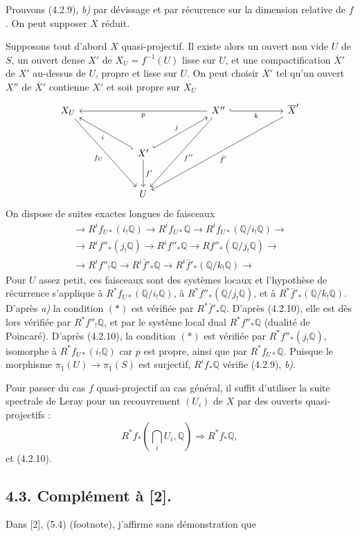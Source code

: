 \documentclass[10pt]{article}
\newcommand{\Q}{\mathbb Q}
\begin{document}
Prouvons (4.2.9), \textit{b)} par dévissage et par récurrence sur la dimension relative de $f$. On peut supposer $X$ réduit.

Supposons tout d'abord $X$ quasi-projectif. Il existe alors un ouvert non vide $U$ de $S$, un ouvert dense $X'$ de $X_U=f^{-1}(U)$ lisse sur $U$, et une compactification $\overline X'$ de $X'$ au-dessus de $U$, propre et lisse sur $U$. On peut choisir $\overline X'$ tel qu'un ouvert $X''$ de $\overline X'$ contienne $X'$ et soit propre sur $X_U$
\[
\begin{tikzcd}[column sep=2.8em,row sep=2.8em]
X_U \arrow[ddrr,"f_U"'] &&&&
X'' \arrow[llll,"p"] \arrow[rr,hook,"k"'] \arrow[ddll,"f''"] &&
\overline X' \arrow[ddllll,"\bar f'"] \\
&& X' \arrow[ull,hook,"i"] \arrow[urr,hook,"j"] \arrow[d,"f'"] &&&& \\
&& U &&&&
\end{tikzcd}
\]
On dispose de suites exactes longues de faisceaux
\[
\begin{gathered}
\to R^if_{U*}(i_!\Q)\to R^if_{U*}\Q\to R^if_{U*}(\Q/i_!\Q)\to\\
\to R^if''_*(j_!\Q)\to R^if''_*\Q\to Rf''_*(\Q/j_!\Q)\to\\
\to R^if''_!\Q\to R^i\bar f'_*\Q\to R^i\bar f'_*(\Q/k_!\Q)\to
\end{gathered}
\]
Pour $U$ assez petit, ces faisceaux sont des systèmes locaux et l'hypothèse de récurrence s'applique à $R^*f_{U*}(\Q/i_!\Q)$, à $R^*f''_*(\Q/j_!\Q)$, et à $R^*\bar f'_*(\Q/k_!\Q)$. D'après \textit{a)} la condition $(*)$ est vérifiée par $R^*\bar f'_*\Q$. D'après (4.2.10), elle est dès lors vérifiée par $R^*f''_!\Q$, et par le système local dual $R^*f''_*\Q$ (dualité de Poincaré). D'après (4.2.10), la condition $(*)$ est vérifiée par $R^*f''_*(j_!\Q)$, isomorphe à $R^*f_{U*}(i_!\Q)$ car $p$ est propre, ainsi que par $R^*f_{U*}\Q$. Puisque le morphisme $\pi_1(U)\to\pi_1(S)$ est surjectif, $R^if_*\Q$ vérifie (4.2.9), \textit{b)}.

Pour passer du cas $f$ quasi-projectif au cas général, il suffit d'utiliser la suite spectrale de Leray pour un recouvrement $(U_i)$ de $X$ par des ouverts quasi-projectifs :
\[
R^*f_*(\bigcap_iU_i,\Q)\Rightarrow R^*f_*\Q,
\]
et (4.2.10).

\subsection*{4.3. Complément à [2].}

Dans [2], (5.4) (footnote), j'affirme sans démonstration que
\end{document}

